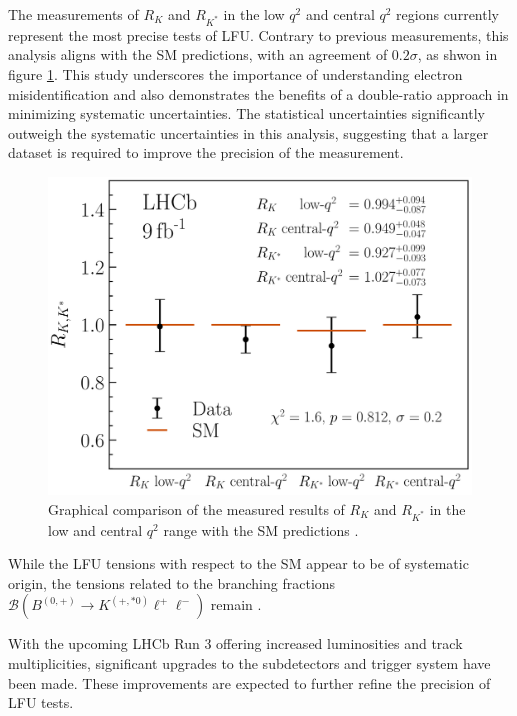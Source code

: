 The measurements of $R_K$ and $R_{K^*}$ in the low $q^2$ 
and central $q^2$ regions currently represent the most 
precise tests of LFU. 
Contrary to previous measurements, this analysis aligns 
with the SM predictions, with an agreement of 
$\num{0.2}\sigma$, as shwon in figure \ref{fig:results}. 
This study underscores the importance of understanding 
electron misidentification and also demonstrates the 
benefits of a double-ratio approach in minimizing 
systematic uncertainties. The statistical uncertainties 
significantly outweigh the systematic uncertainties in this 
analysis, suggesting that a larger dataset is required 
to improve the precision of the measurement.

\begin{figure}[H]
    \centering
    \includegraphics[width=\linewidth]{figures/results.png}
    \caption{Graphical comparison of the measured results of $R_K$ and $R_{K^*}$ in the low and central $q^2$ range with the SM predictions \cite{lhcbcollaboration2022measurement}.}
    \label{fig:results}
\end{figure}

While the LFU tensions with respect to the SM 
appear to be of systematic origin, the tensions related to 
the branching fractions $\mathcal{B}(B^{(0,+)}\to K^{(+,*0)}\ell^+\ell^-)$ 
remain \cite{Branchingfraction}.

With the upcoming LHCb Run 3 offering increased luminosities 
and track multiplicities, significant upgrades to the subdetectors 
and trigger system have been made. These improvements are expected 
to further refine the precision of LFU tests.